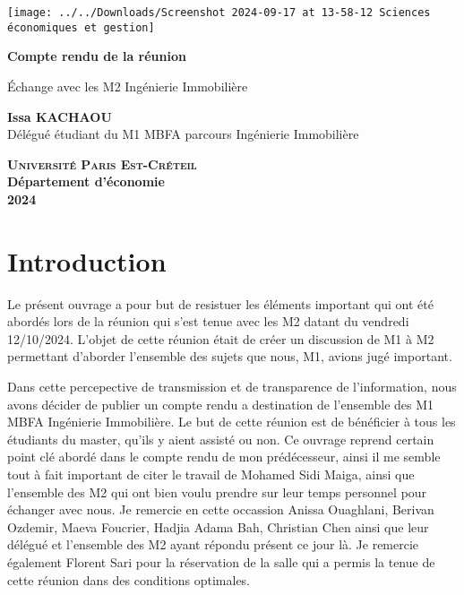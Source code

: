 \documentclass[a4paper, 12pt]{report}
\begin{document}
	
\begin{titlepage}
	\centering
	\begin{center}
		\texttt{[image: ../../Downloads/Screenshot 2024-09-17 at 13-58-12 Sciences économiques et gestion]}
	\end{center}
	\vspace*{2cm}
	
	\Huge
	
	\textbf{Compte rendu de la réunion}
	\vspace{1.5cm}
	
	\Large
	Échange avec les M2 Ingénierie Immobilière
	
	\vspace{2cm}
	
	\textbf{Issa KACHAOU} \\
	{\normalsize Délégué étudiant du M1 MBFA parcours Ingénierie Immobilière}

	
	\vfill
	
	\Large

\textsc{\textbf{Université Paris Est-Créteil}}	 \\
	\textbf{Département d'économie} \\
	\textbf{2024}
	
\end{titlepage}
\thispagestyle{empty}
\newpage
\clearpage
\mbox{}
\thispagestyle{empty}

\tableofcontents

\thispagestyle{empty}
\newpage
\mbox{}
\thispagestyle{empty} %

\chapter{Introduction}

Le présent ouvrage a pour but de resistuer les éléments important qui ont été abordés lors de la réunion qui s'est tenue avec les M2 datant du vendredi 12/10/2024. L'objet de cette réunion était de créer un discussion de M1 à M2 permettant d'aborder l'ensemble des sujets que nous, M1, avions jugé important.  

Dans cette percepective de transmission et de transparence de l'information, nous avons décider de publier un compte rendu a destination de l'ensemble des M1 MBFA Ingénierie Immobilière. Le but de cette réunion est de bénéficier à tous les étudiants du master, qu'ils y aient assisté ou non. Ce ouvrage reprend certain point clé abordé dans le compte rendu de mon prédécesseur, ainsi il me semble tout à fait important de citer le travail de Mohamed Sidi Maiga, ainsi que l'ensemble des M2 qui ont bien voulu prendre sur leur temps personnel pour échanger avec nous. Je remercie en cette occassion Anissa Ouaghlani, Berivan Ozdemir, Maeva Foucrier, Hadjia Adama Bah, Christian Chen ainsi que leur délégué et l'ensemble des M2 ayant répondu présent ce jour là.  Je remercie également Florent Sari pour la réservation de la salle qui a permis la tenue de cette réunion dans des conditions optimales.
\end{document}
